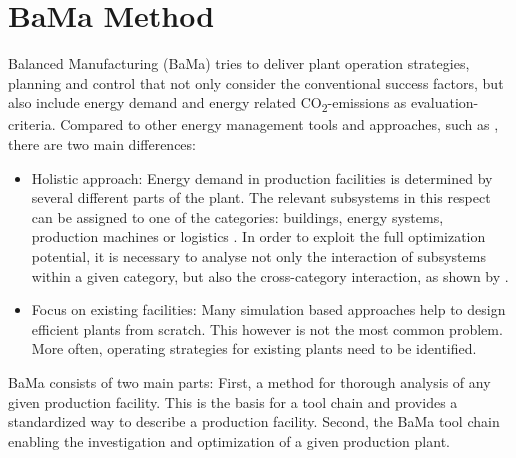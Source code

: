 \documentclass[3p,times,procedia,twocolumn,twoside]{elsarticle}
\begin{document}
\section{BaMa Method}
Balanced Manufacturing (BaMa) tries to deliver plant operation strategies, planning and control that not only consider the conventional success factors, but also include energy demand and energy related CO\textsubscript{2}-emissions as evaluation-criteria. Compared to other energy management tools and approaches, such as \cite{Thiede2012,Introna2014,May2015,Kovacic2013}, there are two main differences: 
\begin{itemize}
	\item  Holistic approach: Energy demand in production facilities is determined by several different parts of the plant. The relevant subsystems in this respect can be assigned to one of the categories: buildings, energy systems, production machines or logistics \cite{Leobner}. In order to exploit the full optimization potential, it is necessary to analyse not only the interaction of subsystems within a given category, but also the cross-category interaction, as shown by \cite{Hesselbach2008,Bleicher2014a}.
	\item Focus on existing facilities: Many simulation based approaches help to design efficient plants from scratch. This however is not the most common problem. More often, operating strategies for existing plants need to be identified.
\end{itemize}
BaMa consists of two main parts: First, a method for thorough analysis of any given production facility. This is the basis for a tool chain and provides a standardized way to describe a production facility. Second, the BaMa tool chain enabling the investigation and optimization of a given production plant.
\end{document}
